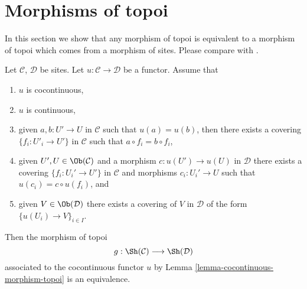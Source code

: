 \section{Morphisms of topoi}
\label{section-morphisms-topoi}

\noindent
In this section we show that any morphism of topoi is equivalent
to a morphism of topoi which comes from a morphism of sites.
Please compare with \cite[Expos\'e IV, Proposition 4.9.4]{SGA4}.

\begin{lemma}
\label{lemma-equivalence}
Let $\mathcal{C}$, $\mathcal{D}$ be sites.
Let $u : \mathcal{C} \to \mathcal{D}$ be a functor.
Assume that
\begin{enumerate}
\item $u$ is cocontinuous,
\item $u$ is continuous,
\item given $a, b : U' \to U$ in $\mathcal{C}$ such that
$u(a) = u(b)$, then there exists a covering $\{f_i : U'_i \to U'\}$
in $\mathcal{C}$ such that $a \circ f_i = b \circ f_i$,
\item given $U', U \in \Ob(\mathcal{C})$ and
a morphism $c : u(U') \to u(U)$ in $\mathcal{D}$ there exists
a covering $\{f_i : U_i' \to U'\}$ in $\mathcal{C}$
and morphisms $c_i : U_i' \to U$ such that $u(c_i) = c \circ u(f_i)$, and
\item given $V \in \Ob(\mathcal{D})$ there exists a covering
of $V$ in $\mathcal{D}$ of the form $\{u(U_i) \to V\}_{i \in I}$.
\end{enumerate}
Then the morphism of topoi
$$
g : \Sh(\mathcal{C}) \longrightarrow \Sh(\mathcal{D})
$$
associated to the cocontinuous functor $u$ by
Lemma \ref{lemma-cocontinuous-morphism-topoi}
is an equivalence.
\end{lemma}

